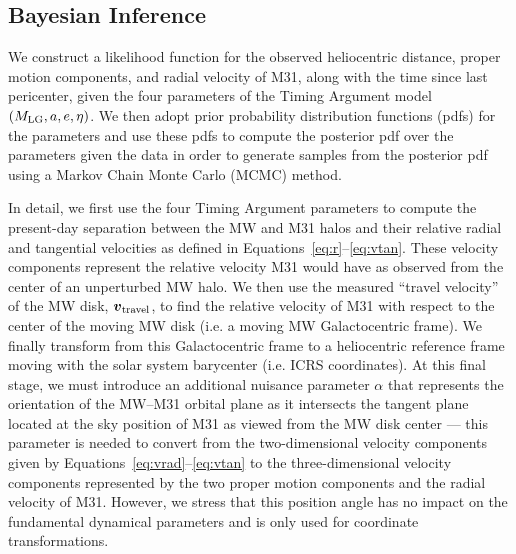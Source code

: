 \documentclass[twocolumn]{aastex631}
\newcommand{\mlg}{\ensuremath{M_{\rm LG}}}
\newcommand{\bov}{\ensuremath{\boldsymbol{v}}}
\newcommand{\vtrav}{\ensuremath{\bov_{\rm travel}}}
\begin{document}
\subsection{Bayesian Inference}
\label{sec:bayes}

We construct a likelihood function for the observed heliocentric distance,
proper motion components, and radial velocity of M31, along with the time since
last pericenter, given the four parameters of the Timing Argument model $(\mlg,
a, e, \eta)$.
We then adopt prior probability distribution functions (pdfs) for the parameters
and use these pdfs to compute the posterior pdf over the parameters given the
data in order to generate samples from the posterior pdf using a Markov Chain
Monte Carlo (MCMC) method.

In detail, we first use the four Timing Argument parameters to compute the
present-day separation between the MW and M31 halos and their relative radial
and tangential velocities as defined in Equations~\ref{eq:r}--\ref{eq:vtan}.
These velocity components represent the relative velocity M31 would have as
observed from the center of an unperturbed MW halo.
We then use the measured ``travel velocity'' of the MW disk,
\vtrav, to find the relative velocity of M31 with respect to the center of the
moving MW disk (i.e. a moving MW Galactocentric frame).
We finally transform from this Galactocentric frame to a heliocentric
reference frame moving with the solar system barycenter (i.e. ICRS coordinates).
At this final stage, we must introduce an additional nuisance parameter $\alpha$
that represents the orientation of the MW--M31 orbital plane as it intersects
the tangent plane located at the sky position of M31 as viewed from the MW disk
center --- this parameter is needed to convert from the two-dimensional velocity
components given by Equations~\ref{eq:vrad}--\ref{eq:vtan} to the
three-dimensional velocity components represented by the two proper motion
components and the radial velocity of M31.
However, we stress that this position angle has no impact on the fundamental
dynamical parameters and is only used for coordinate transformations.
\end{document}
